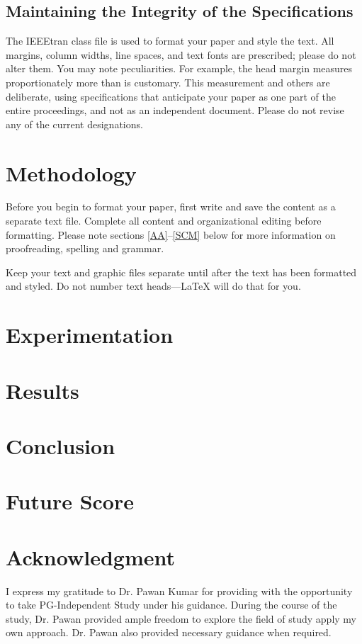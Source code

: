 \documentclass[conference]{IEEEtran}
\begin{document}
		\subsection{Maintaining the Integrity of the Specifications}
		
		The IEEEtran class file is used to format your paper and style the text. All margins, 
		column widths, line spaces, and text fonts are prescribed; please do not 
		alter them. You may note peculiarities. For example, the head margin
		measures proportionately more than is customary. This measurement 
		and others are deliberate, using specifications that anticipate your paper 
		as one part of the entire proceedings, and not as an independent document. 
		Please do not revise any of the current designations.
	
	\section{Methodology}
		Before you begin to format your paper, first write and save the content as a 
		separate text file. Complete all content and organizational editing before 
		formatting. Please note sections \ref{AA}--\ref{SCM} below for more information on 
		proofreading, spelling and grammar.
		
		Keep your text and graphic files separate until after the text has been 
		formatted and styled. Do not number text heads---{\LaTeX} will do that 
		for you.
		
	\section{Experimentation}
		
		
	\section{Results}
		
		
	\section{Conclusion}
		
		
	\section{Future Score}
		
		
	\section*{Acknowledgment}
		I express my gratitude to Dr. Pawan Kumar for providing with the opportunity to take PG-Independent Study under his guidance. During the course of the study, Dr. Pawan provided ample freedom to explore the field of study apply my own approach. Dr. Pawan also provided necessary guidance when required.
		
\end{document}
